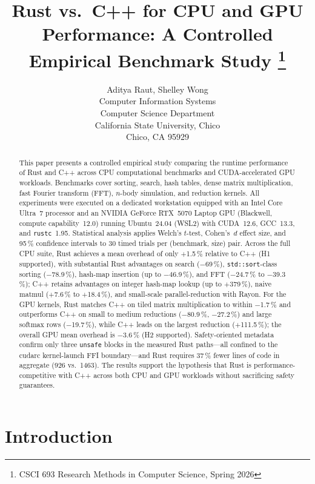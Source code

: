\documentclass{article}
\title{Rust vs.\ C++ for CPU and GPU Performance: A Controlled Empirical Benchmark Study%
  \footnote{CSCI 693 Research Methods in Computer Science, Spring 2026}}
\author{
  Aditya Raut\affmark[1], Shelley Wong\affmark[2]\\
  \affmark[1]Computer Information Systems\\
  \affmark[2]Computer Science Department\\
  California State University, Chico\\
  Chico, CA 95929\\
  \email{\{araut1,swong26\}@csuchico.edu}
}
\begin{document}
\maketitle

\begin{abstract}
This paper presents a controlled empirical study comparing the runtime
performance of Rust and C++ across CPU computational benchmarks and
CUDA-accelerated GPU workloads.
Benchmarks cover sorting, search, hash tables, dense matrix multiplication,
fast Fourier transform (FFT), $n$\nobreakdash-body simulation, and
reduction kernels.
All experiments were executed on a dedicated workstation equipped with an
Intel Core Ultra~7 processor and an NVIDIA GeForce RTX~5070 Laptop GPU
(Blackwell, compute capability~12.0) running Ubuntu~24.04 (WSL2) with
CUDA~12.6, GCC~13.3, and \texttt{rustc}~1.95.
Statistical analysis applies Welch's $t$\nobreakdash-test, Cohen's~$d$
effect size, and 95\,\% confidence intervals to 30 timed trials per
(benchmark, size) pair.
Across the full CPU suite, Rust achieves a mean overhead of only
$+$1.5\,\% relative to C++ (H1 supported), with substantial Rust advantages
on search ($-$69\,\%), \texttt{std::sort}-class sorting
($-$78.9\,\%), hash-map insertion (up to $-$46.9\,\%), and FFT
($-$24.7\,\% to $-$39.3\,\%); C++ retains advantages on integer hash-map
lookup (up to $+$379\,\%), naive matmul ($+$7.6\,\% to $+$18.4\,\%), and
small-scale parallel-reduction with Rayon.
For the GPU kernels, Rust matches C++ on tiled matrix multiplication to
within $-$1.7\,\% and outperforms C++ on small to medium reductions
($-$80.9\,\%, $-$27.2\,\%) and large softmax rows
($-$19.7\,\%), while C++ leads on the largest reduction
($+$111.5\,\%); the overall GPU mean overhead is $-$3.6\,\% (H2 supported).
Safety-oriented metadata confirm only three \texttt{unsafe} blocks in the
measured Rust paths---all confined to the cudarc kernel-launch FFI
boundary---and Rust requires 37\,\% fewer lines of code in aggregate
(926 vs.\ 1463).
The results support the hypothesis that Rust is performance-competitive with
C++ across both CPU and GPU workloads without sacrificing safety guarantees.
\end{abstract}

\section{Introduction}
\end{document}
